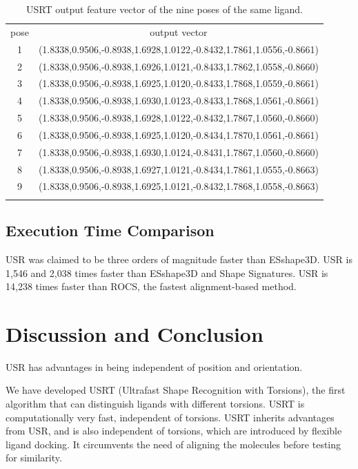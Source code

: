 \documentclass[twocolumn]{svjour3}          %
\begin{document}
\begin{table}
\caption{USRT output feature vector of the nine poses of the same ligand.}
\label{tab:T27output}
\begin{tabular}{cc}
\hline\noalign{\smallskip}
pose & output vector\\
\noalign{\smallskip}\hline\noalign{\smallskip}
1 & (1.8338,0.9506,-0.8938,1.6928,1.0122,-0.8432,1.7861,1.0556,-0.8661)\\
2 & (1.8338,0.9506,-0.8938,1.6926,1.0121,-0.8433,1.7862,1.0558,-0.8660)\\
3 & (1.8338,0.9506,-0.8938,1.6925,1.0120,-0.8433,1.7868,1.0559,-0.8661)\\
4 & (1.8338,0.9506,-0.8938,1.6930,1.0123,-0.8433,1.7868,1.0561,-0.8661)\\
5 & (1.8338,0.9506,-0.8938,1.6928,1.0122,-0.8432,1.7867,1.0560,-0.8660)\\
6 & (1.8338,0.9506,-0.8938,1.6925,1.0120,-0.8434,1.7870,1.0561,-0.8661)\\
7 & (1.8338,0.9506,-0.8938,1.6930,1.0124,-0.8431,1.7867,1.0560,-0.8660)\\
8 & (1.8338,0.9506,-0.8938,1.6927,1.0121,-0.8434,1.7861,1.0555,-0.8663)\\
9 & (1.8338,0.9506,-0.8938,1.6925,1.0121,-0.8432,1.7868,1.0558,-0.8663)\\
\noalign{\smallskip}\hline
\end{tabular}
\end{table}

\subsection{Execution Time Comparison}

USR was claimed to be three orders of magnitude faster than ESshape3D. USR is 1,546 and 2,038 times faster than ESshape3D and Shape Signatures. USR is 14,238 times faster than ROCS, the fastest alignment-based method.

\section{Discussion and Conclusion}

USR has advantages in being independent of position and orientation.

We have developed USRT (Ultrafast Shape Recognition with Torsions), the first algorithm that can distinguish ligands with different torsions. USRT is computationally very fast, independent of torsions. USRT inherits advantages from USR, and is also independent of torsions, which are introduced by flexible ligand docking. It circumvents the need of aligning the molecules before testing for similarity.
\end{document}
